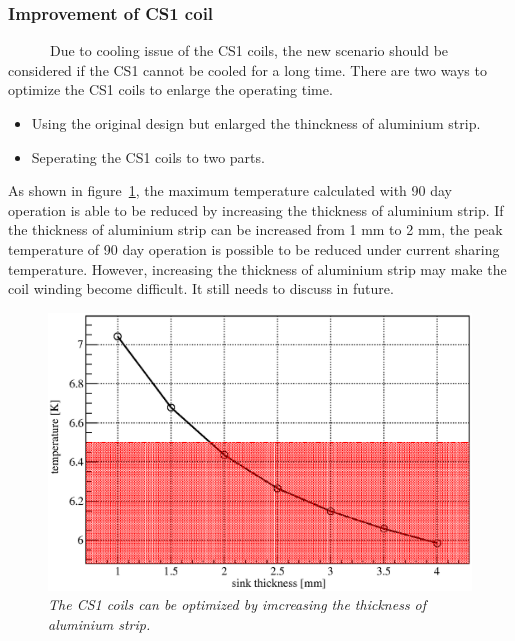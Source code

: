 \subsubsection{Improvement of CS1 coil}
~~~~~~Due to cooling issue of the CS1 coils, the new scenario should be considered if the CS1 cannot be cooled for a long time.
There are two ways to optimize the CS1 coils to enlarge the operating time.
\begin{itemize}
 \setlength{\itemsep}{-5pt}
 \item Using the original design but enlarged the thinckness of aluminium strip.
 \item Seperating the CS1 coils to two parts.
\end{itemize}
As shown in figure~\ref{5opti}, the maximum temperature calculated with 90 day operation is able to be reduced by increasing the thickness of aluminium strip.
If the thickness of aluminium strip can be increased from 1 mm to 2 mm, the peak temperature of 90 day operation is possible to be reduced under current sharing temperature.
However, increasing the thickness of aluminium strip may make the coil winding become difficult.
It still needs to discuss in future.
\begin{figure}[H]
 \centering
 \includegraphics[scale=0.45]{chapter6/fig/Strip.eps}
 \caption{\it The CS1 coils can be optimized by imcreasing the thickness of aluminium strip.}
 \label{5opti}
\end{figure}

